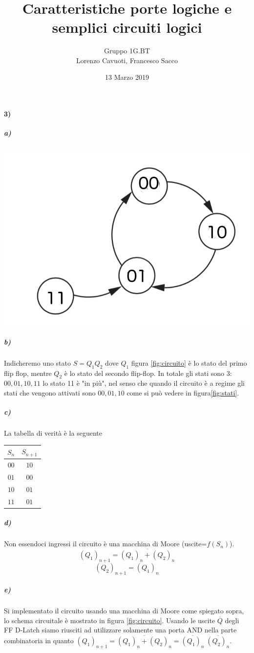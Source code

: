 \documentclass{article}
\date{13 Marzo 2019}
\author{Gruppo 1G.BT \\Lorenzo Cavuoti, Francesco Sacco}
\title{Caratteristiche porte logiche e semplici circuiti logici}
\begin{document}
\maketitle
\paragraph{3)}
	\subparagraph{a)}
		\begin{center}
			\begin{minipage}{.7\linewidth}
				\centering
				\includegraphics[width=0.5\linewidth]{foto/diagramma_a_stati}
				\label{fig:stati}
			\end{minipage}
		\end{center}
	\subparagraph{b)}
		Indicheremo uno stato $S=Q_1Q_2$ dove $Q_1$ figura \ref{fig:circuito} è lo stato del primo flip flop, mentre $Q_2$ è lo stato del secondo flip-flop.\newline
		In totale gli stati sono 3: $00, 01, 10, 11$ lo stato 11 è "in più", nel senso che quando il circuito è a regime gli stati che vengono attivati sono $00,01,10$ come si può vedere in figura\ref{fig:stati}.
	\subparagraph{c)}
		La tabella di verità è la seguente\newline
		\begin{center}
		\begin{tabular}{cc}
			\hline
			$S_n$ & $S_{n+1}$\\
			\hline
			$00$ & $10$\\
			$01$ & $00$\\
			$10$ & $01$\\
			$11$ & $01$\\
			\hline
		\end{tabular}
		\end{center}
	\subparagraph{d)}
		Non essendoci ingressi il circuito è una macchina di Moore (uscite=$f(S_n)$).\newline
		\[
			(Q_1)_{n+1}=\overline{(Q_1)_n+(Q_2)_n}
		\]
		\[
			(Q_2)_{n+1}=(Q_1)_n
		\]
	\subparagraph{e)}
		Si implementato il circuito usando una macchina di Moore come spiegato sopra, lo schema circuitale è mostrato in figura \ref{fig:circuito}. Usando le uscite $\overline{Q}$ degli FF D-Latch siamo riusciti ad utilizzare solamente una porta AND nella parte combinatoria in quanto $(Q_1)_{n+1}=\overline{(Q_1)_n+(Q_2)_n} = \overline{(Q_1)_n} \; \overline{(Q_2)_n}$.
		
\end{document}
